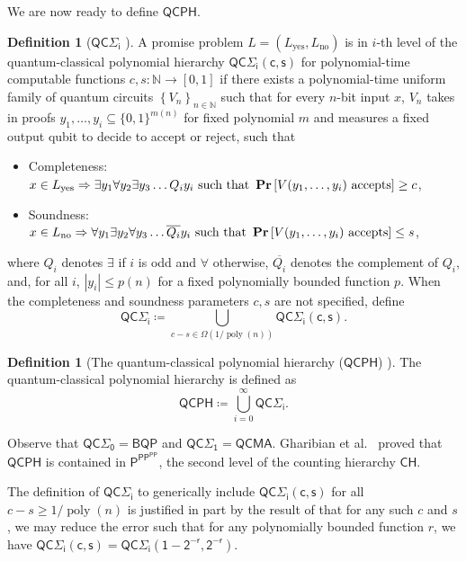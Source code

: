 \documentclass[11pt]{article}
\theoremstyle{definition}
\newtheorem{definition}[theorem]{Definition}
\renewcommand{\Pr}{\mathop{\bf Pr\/}}
\DeclareMathOperator{\poly}{poly}
\newcommand{\yes}{\text{yes}}
\newcommand{\no}{\text{no}}
\newcommand{\nats}{\mathbb N}
\newcommand{\N}{\nats}
\newcommand{\class}[1]{\ensuremath{\mathsf{#1}}\xspace}
\newcommand{\PTIME}{\class{P}}
\newcommand{\BQP}{\class{BQP}}
\newcommand{\QCMA}{\class{QCMA}}
\newcommand{\CH}{\class{CH}}
\newcommand{\PP}{\class{PP}}
\newcommand{\QCPH}{\class{QCPH}}
\newcommand{\QCSigmai}[1][i]{\class{QC\Sigma_{#1}}}
\newcommand{\abs}[1]{\left\lvert #1 \right\rvert}
\begin{document}
We are now ready to define $\QCPH$.

\begin{definition}[$\QCSigmai$ \cite{GSSSY22_qph}] \label{def:qcsigmai}
    A promise problem $L=(L_\yes, L_\no)$ is in $i$-th level of the quantum-classical polynomial hierarchy $\QCSigmai[i]{}\class{(c,s)}$ for polynomial-time computable functions $c, s: \N \to [0,1]$ if there exists a polynomial-time uniform family of quantum circuits $\left\{V_n \right\}_{n \in \N}$ such that for every $n$-bit input $x$, $V_n$ takes in proofs $y_1, \dots, y_i \subseteq \{0,1\}^{m(n)}$ for fixed polynomial $m$ and measures a fixed output qubit to decide to accept or reject, such that
    \begin{itemize}
        \item Completeness: $ x \in L_\yes \Rightarrow  \exists y_1 \forall y_2 \exists y_3 \dots Q_i y_i \text{ such that } \Pr\left[ V( y_1, \dots, y_i) \text{ accepts}\right] \geq c $,
        \item Soundness: $ x\in L_\no \Rightarrow  \forall y_1 \exists y_2  \forall y_3 \dots \overline{Q_i} y_i  \text{ such that } \Pr\left[ V(y_1, \dots, y_i) \text{ accepts}\right] \leq s $,
    \end{itemize}
   where $Q_i$ denotes $\exists$ if $i$ is odd and $\forall$ otherwise, $\overline{Q_i}$ denotes the complement of $Q_i$, and, for all $i$, $\abs{y_i} \leq p(n)$ for a fixed polynomially bounded function $p$. 
   When the completeness and soundness parameters $c, s$ are not specified, define
    \[
        \QCSigmai[i] \coloneqq \bigcup_{c-s \in \Omega\left(1/\poly(n)\right)} \QCSigmai[i]\class{(c,s)}.
    \]
\end{definition}
\begin{definition}[The quantum-classical polynomial hierarchy ($\QCPH$) {\cite{GSSSY22_qph}}]
The quantum-classical polynomial hierarchy is defined as 
\[
\QCPH \coloneqq \bigcup_{i=0}^\infty \QCSigmai.
\]
\end{definition}

Observe that $\QCSigmai[0] = \BQP$ and $\QCSigmai[1] = \QCMA$. Gharibian et al.\ \cite{GSSSY22_qph} proved that $\QCPH$ is contained in $\PTIME^{\PP^\PP}$, the second level of the counting hierarchy $\CH$. 

The definition of $\QCSigmai[i]$ to generically include $\QCSigmai[i]\class{(c,s)}$ for all $c-s\geq 1/\poly(n)$ is justified in part by the result of \cite{GSSSY22_qph} that for any such $c$ and $s$, we may reduce the error such that for any polynomially bounded function $r$, we have
$\QCSigmai[i]\class{(c,s)} = \QCSigmai[i]\class{(1-2^{-r},2^{-r})}$.
\end{document}
